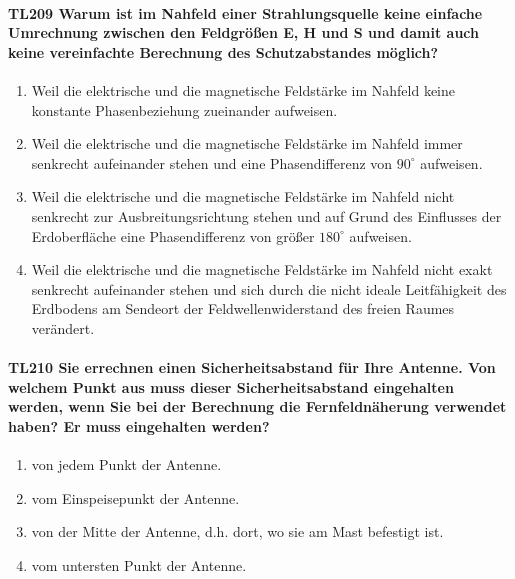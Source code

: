 \documentclass[8pt]{article}
\begin{document}
\paragraph*{TL209 Warum ist im Nahfeld einer Strahlungsquelle keine einfache Umrechnung zwischen den Feldgrößen E, H und S und damit auch keine vereinfachte Berechnung des Schutzabstandes möglich?}
\begin{enumerate}[nolistsep,label=\Alph*]
\item Weil die elektrische und die magnetische Feldstärke im Nahfeld keine konstante Phasenbeziehung zueinander aufweisen.
\item Weil die elektrische und die magnetische Feldstärke im Nahfeld immer senkrecht aufeinander stehen und eine Phasendifferenz von $90^{\circ}$ aufweisen.
\item Weil die elektrische und die magnetische Feldstärke im Nahfeld nicht senkrecht zur Ausbreitungsrichtung stehen und auf Grund des Einflusses der Erdoberfläche eine Phasendifferenz von größer $180^{\circ}$ aufweisen.
\item Weil die elektrische und die magnetische Feldstärke im Nahfeld nicht exakt senkrecht aufeinander stehen und sich durch die nicht ideale Leitfähigkeit des Erdbodens am Sendeort der Feldwellenwiderstand des freien Raumes verändert.
\end{enumerate}

\paragraph*{TL210 Sie errechnen einen Sicherheitsabstand für Ihre Antenne. Von welchem Punkt aus muss dieser Sicherheitsabstand eingehalten werden, wenn Sie bei der Berechnung die Fernfeldnäherung verwendet haben? Er muss eingehalten werden?}
\begin{enumerate}[nolistsep,label=\Alph*]
\item von jedem Punkt der Antenne. 
\item vom Einspeisepunkt der Antenne.
\item von der Mitte der Antenne, d.h. dort, wo sie am Mast befestigt ist.
\item vom untersten Punkt der Antenne.
\end{enumerate}
\end{document}
